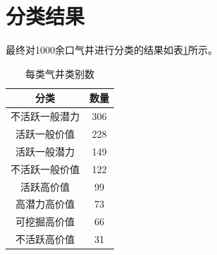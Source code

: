 \section{分类结果}
最终对1000余口气井进行分类的结果如表\ref{fig:classtable}所示。
\begin{table}[h]
    \renewcommand{\arraystretch}{1.5}
    \centering
    \caption{每类气井类别数}
    \label{fig:classtable}
    \begin{tabular}{|c|c|}
    \hline
    分类 & 数量 \\ \hline
    不活跃一般潜力    & 306 \\ \hline
    活跃一般价值    & 228 \\ \hline
    活跃一般潜力    & 149 \\ \hline
    不活跃一般价值    & 122 \\ \hline
    活跃高价值    & 99  \\ \hline
    高潜力高价值    & 73  \\ \hline
    可挖掘高价值  & 66  \\ \hline
    不活跃高价值  & 31  \\ \hline
    \end{tabular}
\end{table}
    